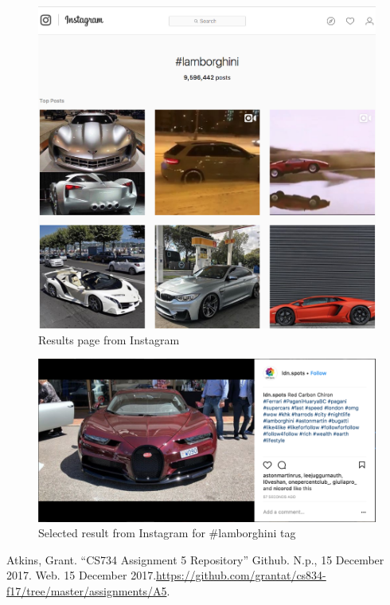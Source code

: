 \documentclass[letterpaper,11pt]{article}
\begin{document}
\begin{figure}[h]
\centering
\includegraphics[scale=0.4]{insta_results.png}
\caption{Results page from Instagram}
\label{fig:insta_results}
\end{figure}

\begin{figure}[h]
\centering
\includegraphics[scale=0.4]{multi_class.png}
\caption{Selected result from Instagram for \#lamborghini tag}
\label{fig:bug}
\end{figure}


\clearpage


\clearpage



\begin{thebibliography}{9}
Atkins, Grant. ``CS734 Assignment 5 Repository'' Github. N.p., 15 December 2017. Web. 15 December 2017.\url{https://github.com/grantat/cs834-f17/tree/master/assignments/A5}.
\end{thebibliography}
\end{document}
